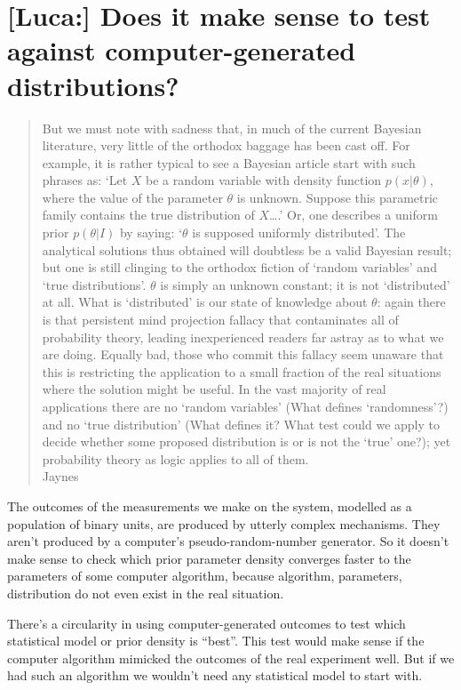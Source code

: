 \documentclass[\ifafour a4paper,12pt,\else a5paper,10pt,\fi%
onecolumn,oneside,article,%
british%
]{memoir}
\theoremstyle{remark}
\theoremstyle{innote}
\newcommand*{\citey}{\parencites*}
\renewcommand*{\|}{\mathpunct{|}}
\newcommand*{\sect}{\S}%
\begin{document}
\section{[Luca:] Does it make sense to test against computer-generated
  distributions?}
\label{sec:makes_no_sense}

\begin{quotation}\small
  But we must note with sadness that, in much of the current Bayesian
  literature, very little of the orthodox baggage has been cast off. For
  example, it is rather typical to see a Bayesian article start with such
  phrases as: `Let $X$ be a random variable with density function
  $p(x|\theta)$, where the value of the parameter $\theta$ is unknown.
  Suppose this parametric family contains the true distribution of
  $X$\ldots.' Or, one describes a uniform prior $p(\theta|I)$ by saying:
  `$\theta$ is supposed uniformly distributed'. The analytical solutions
  thus obtained will doubtless be a valid Bayesian result; but one is still
  clinging to the orthodox fiction of `random variables' and `true
  distributions'. $\theta$ is simply an unknown constant; it is not
  `distributed' at all. What is `distributed' is our state of knowledge
  about $\theta$: again there is that persistent mind projection fallacy
  that contaminates all of probability theory, leading inexperienced
  readers far astray as to what we are doing. Equally bad, those who commit
  this fallacy seem unaware that this is restricting the application to a
  small fraction of the real situations where the solution might be useful.
  In the vast majority of real applications there are no `random variables'
  (What defines `randomness'?) and no `true distribution' (What defines it?
  What test could we apply to decide whether some proposed distribution is
  or is not the `true' one?); yet probability theory as logic applies to
  all of them.\\\small\mbox{}\hfill Jaynes
  \citey[\sect~17.12]{jaynes1994_r2003}
\end{quotation}

The outcomes of the measurements we make on the system, modelled as a
population of binary units, are produced by utterly complex mechanisms.
They aren't produced by a computer's pseudo-random-number generator. So it
doesn't make sense to check which prior parameter density converges faster
to the parameters of some computer algorithm, because algorithm,
parameters, distribution do not even exist in the real situation.

There's a circularity in using computer-generated outcomes to test which
statistical model or prior density is \enquote{best}. This test would make
sense if the computer algorithm mimicked the outcomes of the real
experiment well. But if we had such an algorithm we wouldn't need any
statistical model to start with.
\end{document}
